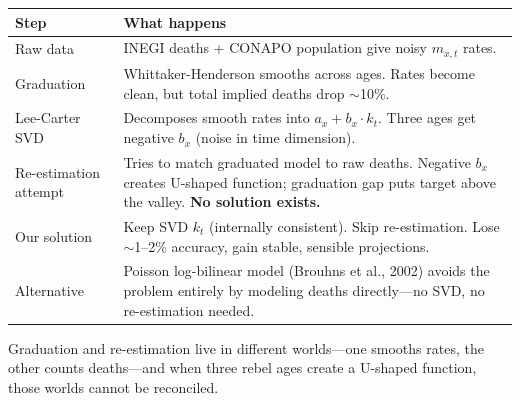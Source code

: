 \documentclass[11pt, a4paper]{article}
\newcommand{\ax}{a_x}
\newcommand{\bx}{b_x}
\newcommand{\kt}{k_t}
\begin{document}
\begin{center}
\renewcommand{\arraystretch}{1.4}
\begin{tabular}{>{\raggedright}p{3.5cm} p{9cm}}
\toprule
\textbf{Step} & \textbf{What happens} \\
\midrule
Raw data &
INEGI deaths + CONAPO population give noisy $m_{x,t}$ rates. \\

Graduation &
Whittaker-Henderson smooths across ages. Rates become clean,
but total implied deaths drop $\sim$10\%. \\

Lee-Carter SVD &
Decomposes smooth rates into $\ax + \bx \cdot \kt$.
Three ages get negative $\bx$ (noise in time dimension). \\

Re-estimation attempt &
Tries to match graduated model to raw deaths.
Negative $\bx$ creates U-shaped function;
graduation gap puts target above the valley.
\textbf{No solution exists.} \\

Our solution &
Keep SVD $\kt$ (internally consistent).
Skip re-estimation. Lose $\sim$1--2\% accuracy,
gain stable, sensible projections. \\

Alternative &
Poisson log-bilinear model (Brouhns et al., 2002)
avoids the problem entirely by modeling deaths
directly---no SVD, no re-estimation needed. \\
\bottomrule
\end{tabular}
\end{center}

\bigskip

\begin{intuition}
Graduation and re-estimation live in different worlds---one smooths
rates, the other counts deaths---and when three rebel ages create
a U-shaped function, those worlds cannot be reconciled.
\end{intuition}
\end{document}
